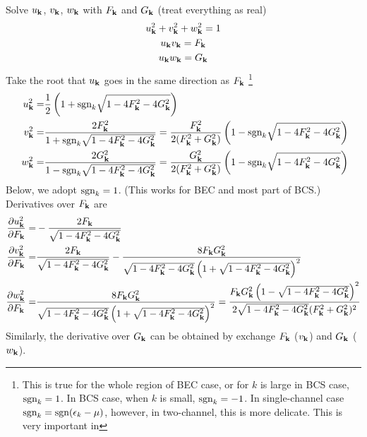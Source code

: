 \documentclass{article}
\begin{document}
Solve $u_{\mathbf{k}}$, $v_{\mathbf{k}}$, $w_{\mathbf{k}}$ with $F_{\mathbf{k}}$ and $G_{\mathbf{k}}$ (treat everything as real)
\begin{gather}
u_{\mathbf{k}}^2+v^{2}_{\mathbf{k}}+w^{2}_{\mathbf{k}}=1\\
u_{\mathbf{k}}v_{\mathbf{k}}=F_{\mathbf{k}}\\
u_{\mathbf{k}}w_{\mathbf{k}}=G_{\mathbf{k}}
\end{gather}
Take the root that $u_{\mathbf{k}}$ goes in the same direction as $F_{\mathbf{k}}$ \footnote{\label{foot:20100909:sgn} This is true for the whole region of BEC case, or for $k$ is large in BCS case, $\text{sgn}_{k}=1$. In BCS case, when $k$ is small, $\text{sgn}_{k}=-1$.  In single-channel case $\text{sgn}_{k}=\text{sgn}(\epsilon_{k}-\mu)$, however, in two-channel, this is more delicate.  This is very important in }
\begin{equation}
\begin{split}
u_{\mathbf{k}}^2=&\frac{1}{2} \left(1+\text{sgn}_{k}\sqrt{1-4 F_{\mathbf{k}}^2-4 G_{\mathbf{k}}^2}\right)\\
v^{2}_{\mathbf{k}}=&\frac{2 F_{\mathbf{k}}^2}{1+\text{sgn}_{k}\sqrt{1-4 F_{\mathbf{k}}^2-4 G_{\mathbf{k}}^2}}
=\frac{ F_{\mathbf{k}}^2}{2( F_{\mathbf{k}}^2+ G_{\mathbf{k}}^2)} \left(1-\text{sgn}_{k}\sqrt{1-4 F_{\mathbf{k}}^2-4 G_{\mathbf{k}}^2}\right)\\\
w^{2}_{\mathbf{k}}=&\frac{2 G_{\mathbf{k}}^2}{1-\text{sgn}_{k}\sqrt{1-4 F_{\mathbf{k}}^2-4 G_{\mathbf{k}}^2}}
=\frac{G_{\mathbf{k}}^2}{2( F_{\mathbf{k}}^2+ G_{\mathbf{k}}^2)} \left(1-\text{sgn}_{k}\sqrt{1-4 F_{\mathbf{k}}^2-4 G_{\mathbf{k}}^2}\right)
\end{split}
\end{equation}
Below, we adopt $\text{sgn}_k=1$. (This works for BEC and most part of BCS.) Derivatives over $F_{\mathbf{k}}$ are
\begin{equation}
\begin{split}
\frac{\partial{u_{\ensuremath{\mathbf{k}}}^2}}{\partial{F_{\ensuremath{\mathbf{k}}}}}=&-\frac{2 F_{\mathbf{k}}}{\sqrt{1-4 F_{\mathbf{k}}^2-4 G_{\mathbf{k}}^2}}\\
\frac{\partial{v_{\ensuremath{\mathbf{k}}}^2}}{\partial{F_{\ensuremath{\mathbf{k}}}}}=&\frac{2 F_{\mathbf{k}}}{\sqrt{1-4 F_{\mathbf{k}}^2-4 G_{\mathbf{k}}^2}}-\frac{8 F_{\mathbf{k}} G_{\mathbf{k}}^2}{\sqrt{1-4 F_{\mathbf{k}}^2-4 G_{\mathbf{k}}^2} \left(1+\sqrt{1-4 F_{\mathbf{k}}^2-4 G_{\mathbf{k}}^2}\right)^2}\\
\frac{\partial{w_{\ensuremath{\mathbf{k}}}^2}}{\partial{F_{\ensuremath{\mathbf{k}}}}}=&\frac{8 F_{\mathbf{k}} G_{\mathbf{k}}^2}{\sqrt{1-4 F_{\mathbf{k}}^2-4 G_{\mathbf{k}}^2} \left(1+\sqrt{1-4 F_{\mathbf{k}}^2-4 G_{\mathbf{k}}^2}\right)^2}
=\frac{F_{\mathbf{k}} G_{\mathbf{k}}^2 \left(1-\sqrt{1-4 F_{\mathbf{k}}^2-4 G_{\mathbf{k}}^2}\right)^2}{2\sqrt{1-4 F_{\mathbf{k}}^2-4 G_{\mathbf{k}}^2} (F_{\mathbf{k}}^2 + G_{\mathbf{k}}^2)^2}
\end{split}
\end{equation}
Similarly, the derivative over $G_{\mathbf{k}}$ can be obtained by exchange $F_{\mathbf{k}}$ ($v_{\mathbf{k}}$) and $G_{\mathbf{k}}$ ($w_{\mathbf{k}}$).
\end{document}
